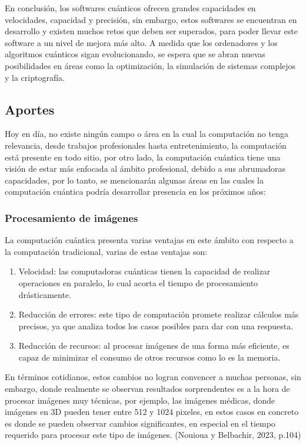 \documentclass{article}
\begin{document}
En conclusión, los softwares cuánticos ofrecen grandes capacidades en velocidades, capacidad y precisión, sin embargo, estos softwares se encuentran en desarrollo y existen muchos retos que deben ser superados, para poder llevar este software a un nivel de mejora más alto. A medida que los ordenadores y los algoritmos cuánticos sigan evolucionando, se espera que se abran nuevas posibilidades en áreas como la optimización, la simulación de sistemas complejos y la criptografía. 

\subsection{Aportes}
Hoy en día, no existe ningún campo o área en la cual la computación no tenga relevancia, desde trabajos profesionales hasta entretenimiento, la computación está presente en todo sitio, por otro lado, la computación cuántica tiene una visión de estar más enfocada al ámbito profesional, debido a sus abrumadoras capacidades, por lo tanto, se mencionarán algunas áreas en las cuales la computación cuántica podría desarrollar presencia en los próximos años:

\subsubsection{Procesamiento de imágenes} 
La computación cuántica presenta varias ventajas en este ámbito con respecto a la computación tradicional, varias de estas ventajas son: 
\begin{enumerate}
    \item Velocidad: las computadoras cuánticas tienen la capacidad de realizar operaciones en paralelo, lo cual acorta el tiempo de procesamiento drásticamente.

    \item Reducción de errores: este tipo de computación promete realizar cálculos más precisos, ya que analiza todos los casos posibles para dar con una respuesta.

    \item Reducción de recursos: al procesar imágenes de una forma más eficiente, es capaz de minimizar el consumo de otros recursos como lo es la memoria.
\end{enumerate}

En términos cotidianos, estos cambios no logran convencer a muchas personas, sin embargo, donde realmente se observan resultados sorprendentes es a la hora de procesar imágenes muy técnicas, por ejemplo, las imágenes médicas, donde imágenes en 3D pueden tener entre 512 y 1024 pixeles, en estos casos en concreto es donde se pueden observar cambios significantes, en especial en el tiempo requerido para procesar este tipo de imágenes. (Nouioua y Belbachir, 2023, p.104)
\end{document}

